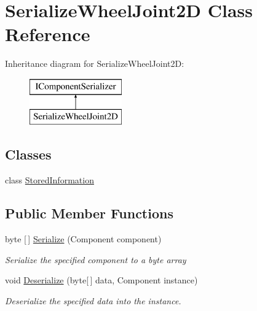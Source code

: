 \hypertarget{class_serialize_wheel_joint2_d}{}\section{Serialize\+Wheel\+Joint2D Class Reference}
\label{class_serialize_wheel_joint2_d}
Inheritance diagram for Serialize\+Wheel\+Joint2D\+:\begin{figure}[H]
\begin{center}
\leavevmode
\includegraphics[height=2.000000cm]{class_serialize_wheel_joint2_d}
\end{center}
\end{figure}
\subsection*{Classes}
\begin{DoxyCompactItemize}
\item 
class \hyperlink{class_serialize_wheel_joint2_d_1_1_stored_information}{Stored\+Information}
\end{DoxyCompactItemize}
\subsection*{Public Member Functions}
\begin{DoxyCompactItemize}
\item 
byte \mbox{[}$\,$\mbox{]} \hyperlink{class_serialize_wheel_joint2_d_a832d5d2bce3ce68dfb32b5b00fd45719}{Serialize} (Component component)
\begin{DoxyCompactList}\small\item\em Serialize the specified component to a byte array \end{DoxyCompactList}\item 
void \hyperlink{class_serialize_wheel_joint2_d_af4223b135bd9cf9be33639922944f9de}{Deserialize} (byte\mbox{[}$\,$\mbox{]} data, Component instance)
\begin{DoxyCompactList}\small\item\em Deserialize the specified data into the instance. \end{DoxyCompactList}\end{DoxyCompactItemize}


